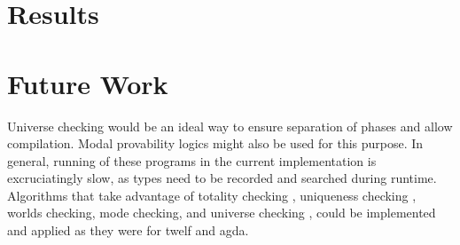 
\section{Results}


\section{Future Work}

Universe checking would be an ideal way to ensure separation of phases and allow compilation. 
Modal provability logics might also be used for this purpose.  
In general, running of these programs in the current implementation is excruciatingly slow, 
as types need to be recorded and searched during runtime.  
Algorithms that take advantage of totality checking \citep{altenkirch2010termination}, 
uniqueness checking \citep{anderson2004verifying}, 
worlds checking\citep{anderson2004verifying}, 
mode checking\citep{anderson2004verifying}, 
and universe checking \citep{harper1991type}, 
could be implemented and applied as they were for twelf and agda.  